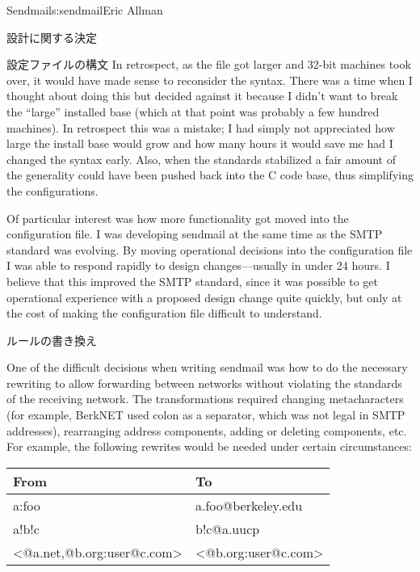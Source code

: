 \begin{aosachapter}{Sendmail}{s:sendmail}{Eric Allman}
\begin{aosasect1}{設計に関する決定}
\begin{aosasect2}{設定ファイルの構文}
In retrospect, as the file got larger and 32-bit machines took over,
it would have made sense to reconsider the syntax. There was a time
when I thought about doing this but decided against it because I
didn't want to break the ``large'' installed base (which at that point
was probably a few hundred machines). In retrospect this was a
mistake; I had simply not appreciated how large the install base would
grow and how many hours it would save me had I changed the syntax
early.  Also, when the standards stabilized a fair amount of the
generality could have been pushed back into the C code base, thus
simplifying the configurations.

Of particular interest was how more functionality got moved into the
configuration file. I was developing sendmail at the same time as the
SMTP standard was evolving. By moving operational decisions into the
configuration file I was able to respond rapidly to design
changes---usually in under 24 hours. I believe that this improved the
SMTP standard, since it was possible to get operational experience
with a proposed design change quite quickly, but only at the cost of
making the configuration file difficult to understand.

\end{aosasect2}

\begin{aosasect2}{ルールの書き換え}

One of the difficult decisions when writing sendmail was how to do the
necessary rewriting to allow forwarding between networks without
violating the standards of the receiving network. The transformations
required changing metacharacters (for example, BerkNET used colon as a
separator, which was not legal in SMTP addresses), rearranging address
components, adding or deleting components, etc. For example, the
following rewrites would be needed under certain circumstances:

\begin{table}[h!]\centering
\begin{tabular}{|ll|}
\hline
From & To \\
\hline
a:foo & a.foo@berkeley.edu \\
a!b!c & b!c@a.uucp \\
{\textless}@a.net,@b.org:user@c.com{\textgreater} & {\textless}@b.org:user@c.com{\textgreater} \\
\hline
\end{tabular}
\end{table}


\end{aosasect2}
\end{aosasect1}
\end{aosachapter}
